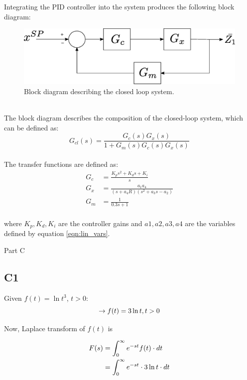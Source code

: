 \documentclass[a4paper,10pt,reqno]{amsart}
\makeatletter
\def\section{\@startsection{section}{1}%
  \z@{.7\linespacing\@plus\linespacing}{.5\linespacing}%
  {\bfseries\scshape\centering}}
\numberwithin{equation}{section}
\makeatother
\begin{document}
Integrating the PID controller into the system produces the following block diagram:
\\
\begin{figure}[h]
 \centering
 \includegraphics[width=0.8\linewidth]{Figures/Controller_Loop.eps}
 \caption{Block diagram describing the closed loop system.}
 \label{fig:B6Diagram}
\end{figure}
\\
The block diagram describes the composition of the closed-loop system, which can be defined as: \begin{equation}
    G_{cl}(s) = \frac{G_c(s)G_x(s)}{1 + G_m(s)G_c(s)G_x(s)}
\end{equation}
\\
The transfer functions are defined as:
\begin{align*}
    G_c &{}={} \frac{K_ps^2+K_ds+K_i}{s}
    \\
    G_x &{}={} \frac{a_1a_4}{(s+a_4R)(s^2+a_3s-a_2)}
    \\
    G_m &{}={} \frac{1}{0.3s+1}
\end{align*}
\\
where $K_p, K_d, K_i$ are the controller gains and $a1, a2, a3, a4$ are the variables defined by equation \ref{eqn:lin_vars}.

\newpage
\section{Part C}\label{sec:C}

\subsection{C1}
\par Given $f(t) = \ln{t^3}$, $t>0$:
\begin{equation}
    \rightarrow f(t) = 3\ln{t}, t>0
    \notag
\end{equation}

\par Now, Laplace transform of $f(t)$ is

\begin{align}
    F(s) &= \int_0^\infty e^{-st} f(t) \cdot dt
    \notag\\
    &= \int_0^\infty e^{-st} \cdot 3\ln{t} \cdot dt
    \label{eqn:C1Lap}
\end{align}
\end{document}
